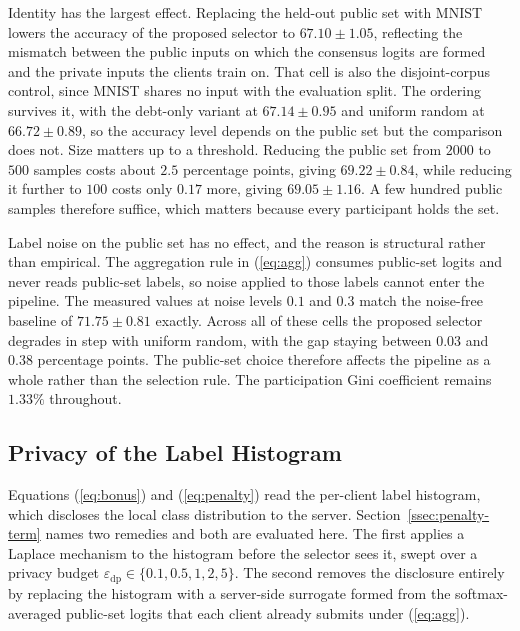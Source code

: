 \documentclass[journal]{IEEEtran}
\newcommand{\rev}[1]{#1}
\begin{document}
\rev{Identity has the largest effect. Replacing the held-out public set with MNIST lowers the accuracy of the proposed selector to $67.10 \pm 1.05$, reflecting the mismatch between the public inputs on which the consensus logits are formed and the private inputs the clients train on. That cell is also the disjoint-corpus control, since MNIST shares no input with the evaluation split. The ordering survives it, with the debt-only variant at $67.14 \pm 0.95$ and uniform random at $66.72 \pm 0.89$, so the accuracy level depends on the public set but the comparison does not. Size matters up to a threshold. Reducing the public set from $2000$ to $500$ samples costs about $2.5$ percentage points, giving $69.22 \pm 0.84$, while reducing it further to $100$ costs only $0.17$ more, giving $69.05 \pm 1.16$. A few hundred public samples therefore suffice, which matters because every participant holds the set.}

\rev{Label noise on the public set has no effect, and the reason is structural rather than empirical. The aggregation rule in (\ref{eq:agg}) consumes public-set logits and never reads public-set labels, so noise applied to those labels cannot enter the pipeline. The measured values at noise levels $0.1$ and $0.3$ match the noise-free baseline of $71.75 \pm 0.81$ exactly. Across all of these cells the proposed selector degrades in step with uniform random, with the gap staying between $0.03$ and $0.38$ percentage points. The public-set choice therefore affects the pipeline as a whole rather than the selection rule. The participation Gini coefficient remains $1.33\%$ throughout.}

\subsection{Privacy of the Label Histogram}
\label{ssec:exp-privacy}

\rev{Equations (\ref{eq:bonus}) and (\ref{eq:penalty}) read the per-client label histogram, which discloses the local class distribution to the server. Section~\ref{ssec:penalty-term} names two remedies and both are evaluated here. The first applies a Laplace mechanism to the histogram before the selector sees it, swept over a privacy budget $\varepsilon_{\mathrm{dp}} \in \{0.1, 0.5, 1, 2, 5\}$. The second removes the disclosure entirely by replacing the histogram with a server-side surrogate formed from the softmax-averaged public-set logits that each client already submits under (\ref{eq:agg}).}
\end{document}

